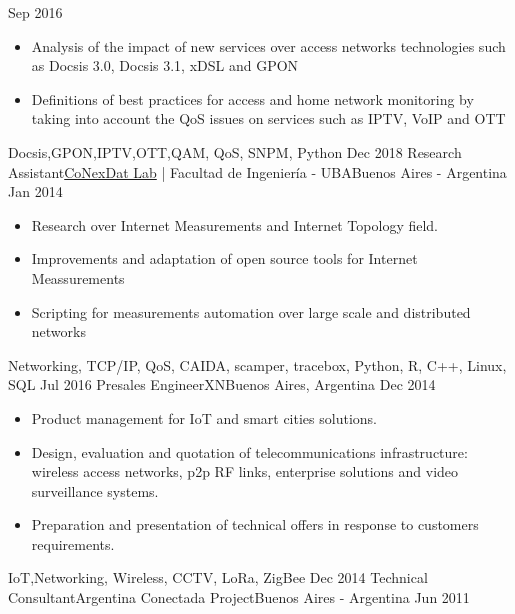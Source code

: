 \begin{experiences}
    {Sep 2016}    {
                      \begin{itemize}
                      \item Analysis of the impact of new services over access networks technologies such as Docsis 3.0, Docsis 3.1, xDSL and GPON
                      \item Definitions of best practices for access  and home network monitoring by taking into account the QoS issues on services such as IPTV, VoIP and OTT
                      \end{itemize}
                    }
                    {Docsis,GPON,IPTV,OTT,QAM, QoS, SNPM, Python}
  \emptySeparator
  \experience
    {Dec 2018}     {Research Assistant}{\href{https://cnet.fi.uba.ar/en/}{\color{accentcolor}CoNexDat Lab} | Facultad de Ingeniería - UBA}{Buenos Aires - Argentina}
    {Jan 2014}    {
                      \begin{itemize}
                        \item Research over Internet Measurements and Internet Topology field.
                        \item Improvements and adaptation of open source tools for Internet Meassurements
                        \item Scripting for  measurements automation over large scale and distributed networks
                      \end{itemize}
                    }
                    {Networking, TCP/IP, QoS, CAIDA, scamper, tracebox, Python, R, C++, Linux, SQL}
  \emptySeparator
  \experience
  {Jul 2016}       {Presales Engineer}{XN}{Buenos Aires, Argentina}
  {Dec 2014}   {
                      \begin{itemize}
                      \item Product management for IoT  and smart cities solutions.
                      \item Design, evaluation and quotation of telecommunications infrastructure: wireless access networks, p2p RF links, enterprise solutions and video surveillance systems.
                      \item Preparation and presentation of technical offers in response to customers requirements.
                      \end{itemize}
                    }
                    {IoT,Networking, Wireless, CCTV, LoRa, ZigBee}
  \emptySeparator         
  \experience
  {Dec 2014}  {Technical Consultant}{Argentina Conectada Project}{Buenos Aires - Argentina}
  {Jun 2011}   {
}
\end{experiences}
